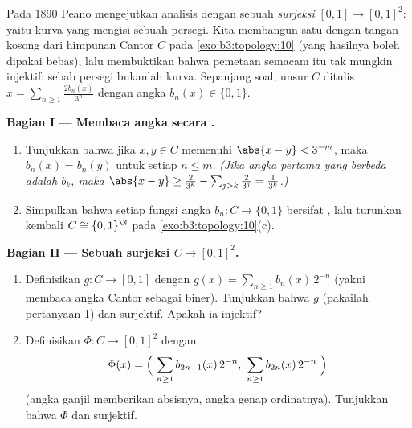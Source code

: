 \begin{problem}\label{pb:b3:topology:1}
Pada 1890 Peano mengejutkan analisis dengan sebuah \emph{surjeksi
} $[0,1] \to [0,1]^2$: yaitu kurva yang mengisi sebuah persegi. Kita
membangun satu dengan tangan kosong dari himpunan Cantor $C$ pada
\cref{exo:b3:topology:10} (yang hasilnya boleh dipakai bebas),
lalu membuktikan bahwa pemetaan semacam itu tak mungkin injektif: sebab persegi
bukanlah kurva. Sepanjang soal, unsur $C$ ditulis $x =
\sum_{n \geq 1} \frac{2b_n(x)}{3^n}$ dengan angka $b_n(x) \in
\{0, 1\}$.

\medskip
\noindent\textbf{Bagian I --- Membaca angka secara .}
\begin{enumerate}
  \item Tunjukkan bahwa jika $x, y \in C$ memenuhi $\abs{x - y} <
        3^{-m}$, maka $b_n(x) = b_n(y)$ untuk setiap $n \leq m$.
        \emph{(Jika angka pertama yang berbeda adalah $b_k$, maka
        $\abs{x - y} \geq \frac{2}{3^k} - \sum_{j>k}\frac2{3^j}
        = \frac1{3^k}$.)}
  \item Simpulkan bahwa setiap fungsi angka $b_n \colon C \to \{0,
        1\}$ bersifat , lalu turunkan kembali  $C
        \cong \{0,1\}^\N$ pada \cref{exo:b3:topology:10}(c).
\end{enumerate}

\medskip
\noindent\textbf{Bagian II --- Sebuah surjeksi  $C \to
[0,1]^2$.}
\begin{enumerate}[resume]
  \item Definisikan $g \colon C \to [0,1]$ dengan $g(x) = \sum_{n\geq1}
        b_n(x)\,2^{-n}$ (yakni membaca angka Cantor sebagai biner).
        Tunjukkan bahwa $g$  (pakailah pertanyaan 1) dan
        surjektif. Apakah ia injektif?
  \item Definisikan $\Phi \colon C \to [0,1]^2$ dengan
        \[
        \Phi(x) = \Bigl(\ \sum_{n\geq1} b_{2n-1}(x)\,2^{-n},\
        \sum_{n\geq1} b_{2n}(x)\,2^{-n}\ \Bigr)
        \]
        (angka ganjil memberikan absisnya, angka genap
        ordinatnya). Tunjukkan bahwa $\Phi$  dan
        surjektif.
\end{enumerate}


\end{problem}
